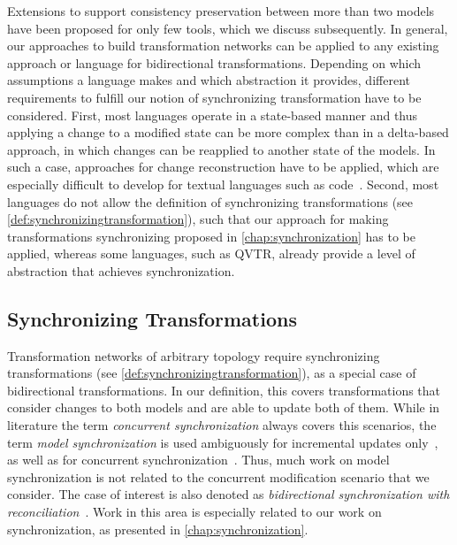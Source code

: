 Extensions to support consistency preservation between more than two models have been proposed for only few tools, which we discuss subsequently.
In general, our approaches to build transformation networks can be applied to any existing approach or language for bidirectional transformations.
Depending on which assumptions a language makes and which abstraction it provides, different requirements to fulfill our notion of synchronizing transformation have to be considered.
First, most languages operate in a state-based manner and thus applying a change to a modified state can be more complex than in a delta-based approach, in which changes can be reapplied to another state of the models. 
In such a case, approaches for change reconstruction have to be applied, which are especially difficult to develop for textual languages such as code~\cite{falleri2014codeDifferencing-ASE}.
Second, most languages do not allow the definition of synchronizing transformations (see \autoref{def:synchronizingtransformation}), such that our approach for making transformations synchronizing proposed in \autoref{chap:synchronization} has to be applied, whereas some languages, such as \gls{QVTR}, already provide a level of abstraction that achieves synchronization.


\subsection{Synchronizing Transformations}

Transformation networks of arbitrary topology require synchronizing transformations (see \autoref{def:synchronizingtransformation}), as a special case of bidirectional transformations.
In our definition, this covers transformations that consider changes to both models and are able to update both of them.
While in literature the term \emph{concurrent synchronization} always covers this scenarios, the term \emph{model synchronization} is used ambiguously for incremental updates only~\cite{giese2009incrementalModelSynchronization-SoSym}, as well as for concurrent synchronization~\cite{samimi-dehkordi2015bidirectionalSynchronization-ICCKE}.
Thus, much work on model synchronization is not related to the concurrent modification scenario that we consider.
The case of interest is also denoted as \emph{bidirectional synchronization with reconciliation}~\cite{antkiewicz2008synchronizationDesignSpace-GTTSE}.
Work in this area is especially related to our work on synchronization, as presented in \autoref{chap:synchronization}.

